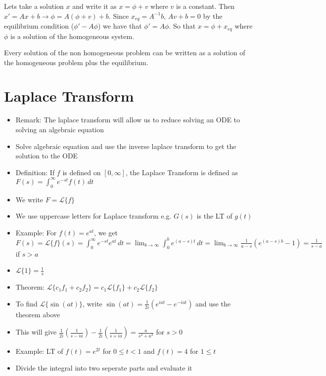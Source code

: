 \documentclass{article}
\begin{document}
Lets take a solution $x$ and write it as $x = \phi + v$ where $v$ is a constant. Then $x' = Ax + b \rightarrow \phi = A(\phi + v) + b$. Since $x_{eq} = A^{-1}b$, $Av+b =0$ by the equilibrium condition ($\phi' - A \phi$) we have that $\phi' = A \phi$. So that $x = \phi + x_{eq}$ where $\phi$ is a solution of the homogeneous system. 

Every solution of the non homogeneous problem can be written as a solution of the homogeneous problem plus the equilibrium. 

\section{Laplace Transform}

\begin{itemize}
    \item Remark: The laplace transform will allow us to reduce solving an ODE to solving an algebraic equation
    \item Solve algebraic equation and use the inverse laplace transform to get the solution to the ODE
    \item Definition: If $f$ is defined on $[0, \infty]$, the Laplace Transform is defined as $F(s) = \int_{0}^{\infty} e^{-st} f(t) \, dt$
    \item We write $F = \mathcal{L} \{f\}$
    \item We use uppercase letters for Laplace transform e.g. $G(s)$ is the LT of $g(t)$
    \item Example: For $f(t) = e^{at}$, we get $F(s) = \mathcal{L}\{f\}(s) = \int_{0}^{\infty} e^{-st} e^{at} \, dt = \lim_{b\rightarrow \infty} \int_{0}^{b} e^{(a-s)t} \, dt = \lim_{b\rightarrow \infty} \frac{1}{a-s} \left( e^{(a-s)b} - 1 \right) = \frac{1}{s-a}$ if $s > a$
    \item $\mathcal{L} \{1\} = \frac{1}{s}$
    \item Theorem: $\mathcal{L} \{c_1f_1 + c_2f_2\} = c_1 \mathcal{L} \{f_1\} + c_2 \mathcal{L} \{f_2\}$
    \item To find $\mathcal{L} \{\sin(at)\}$, write $\sin(at) = \frac{1}{2i} (e^{iat} - e^{-iat})$ and use the theorem above
    \item This will give $\frac{1}{2i} \left(\frac{1}{s - ia}\right) - \frac{1}{2i} \left(\frac{1}{s+ia}\right) = \frac{a}{s^2 + a^2}$ for $s > 0$
    \item Example: LT of $f(t) = e^{2t}$ for $0 \leq t < 1$ and $f(t) = 4$ for $1 \leq t$
    \item Divide the integral into two seperate parts and evaluate it

\end{itemize}
\end{document}
